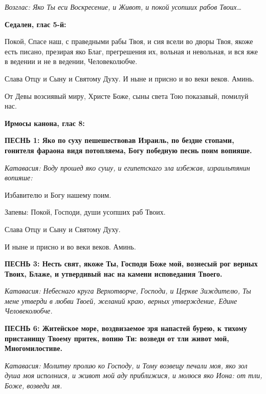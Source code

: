  \itshape  Возглас:\normalfont{} Яко Ты еси Воскресение, и Живот, и покой усопших рабов
Твоих…



 

\bfseries Седален, глас 5-й:\normalfont{}

   Покой, Спасе наш, с праведными рабы Твоя, и сия всели во дворы Твоя,
якоже есть писано, презирая яко Благ, прегрешения их, вольная и невольная,
и вся яже в ведении и не в ведении, Человеколюбче.


   Слава Отцу и Сыну и Святому Духу. И ныне и присно и во веки веков.
Аминь.


   От Девы возсиявый миру, Христе Боже, сыны света Тою показавый,
помилуй нас.


 

\bfseries Ирмосы канона, глас 8:\normalfont{}

 

\bfseries ПЕСНЬ 1:\normalfont{}  Яко по суху пешешествовав Израиль, по бездне стопами,
гонителя фараона видя потопляема, Богу победную песнь поим вопияше.


 \itshape Катавасия:\normalfont{} Воду прошед яко сушу, и египетскаго зла избежав,
израильтянин вопияше:


   Избавителю и Богу нашему поим.


   Запевы: Покой, Господи, души усопших раб Твоих.


   Слава Отцу и Сыну и Святому Духу.


   И ныне и присно и во веки веков. Аминь.


 

\bfseries ПЕСНЬ 3:\normalfont{}  Несть свят, якоже Ты, Господи Боже мой, вознесый
рог верных Твоих, Блаже, и утвердивый нас на камени исповедания
Твоего.


 \itshape Катавасия:\normalfont{} Небеснаго круга Верхотворче, Господи, и Церкве Зиждителю,
Ты мене утверди в любви Твоей, желаний краю, верных утверждение, Едине
Человеколюбче.



 

\bfseries ПЕСНЬ 6:\normalfont{}  Житейское море, воздвизаемое зря напастей бурею, к тихому
пристанищу Твоему притек, вопию Ти: возведи от тли живот мой,
Многомилостиве.


 \itshape Катавасия:\normalfont{} Молитву пролию ко Господу, и Тому возвещу печали моя, яко
зол душа моя исполнися, и живот мой аду приближися, и молюся яко Иона:
от тли, Боже, возведи мя.


